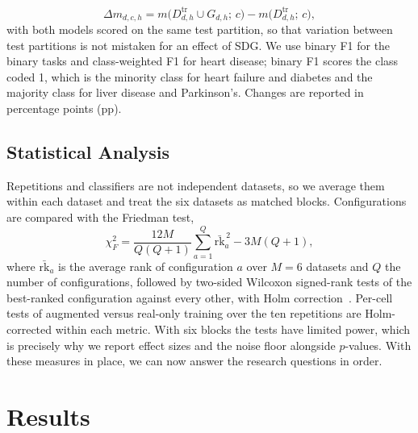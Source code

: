 \documentclass[conference]{IEEEtran}
\begin{document}
\begin{equation}
\Delta m_{d,c,h}=m\bigl(D^{\mathrm{tr}}_{d,h}\cup G_{d,h};\,c\bigr)-m\bigl(D^{\mathrm{tr}}_{d,h};\,c\bigr),
\label{eq:utility}
\end{equation}
with both models scored on the same test partition, so that variation between test partitions is not mistaken for an effect of SDG. We use binary F1 for the binary tasks and class-weighted F1 for heart disease; binary F1 scores the class coded 1, which is the minority class for heart failure and diabetes and the majority class for liver disease and Parkinson's. Changes are reported in percentage points (pp).

\subsection{Statistical Analysis}
Repetitions and classifiers are not independent datasets, so we average them within each dataset and treat the six datasets as matched blocks. Configurations are compared with the Friedman test,
\begin{equation}
\chi^2_F=\frac{12M}{Q(Q+1)}\sum_{a=1}^{Q}\bar{\mathrm{rk}}_a^{\,2}-3M(Q+1),
\label{eq:friedman}
\end{equation}
where $\bar{\mathrm{rk}}_a$ is the average rank of configuration $a$ over $M=6$ datasets and $Q$ the number of configurations, followed by two-sided Wilcoxon signed-rank tests of the best-ranked configuration against every other, with Holm correction~\cite{demsar2006statistical,holm1979procedure}. Per-cell tests of augmented versus real-only training over the ten repetitions are Holm-corrected within each metric. With six blocks the tests have limited power, which is precisely why we report effect sizes and the noise floor alongside $p$-values. With these measures in place, we can now answer the research questions in order.

\section{Results}
\label{sec:results}
\end{document}

